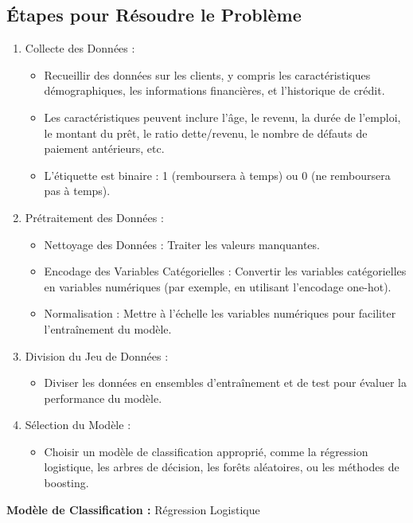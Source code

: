 \documentclass[12pt,a4paper,openay]{book}
\numberwithin{equation}{chapter}
\begin{document}
	\subsection*{Étapes pour R\'esoudre le Probl\`eme}
	
	\begin{enumerate}
		\item Collecte des Donn\'ees :
		\begin{itemize}
			\item  Recueillir des donn\'ees sur les clients, y compris les caract\'eristiques d\'emographiques, les informations financi\`eres, et l'historique de cr\'edit.
			\item  Les caract\'eristiques peuvent inclure l'âge, le revenu, la dur\'ee de l'emploi, le montant du pr\^et, le ratio dette/revenu, le nombre de d\'efauts de paiement ant\'erieurs, etc.
			\item  L'\'etiquette est binaire : 1 (remboursera \`a temps) ou 0 (ne remboursera pas \`a temps).
		\end{itemize}
		
		\item Pr\'etraitement des Donn\'ees :
		\begin{itemize}
			\item Nettoyage des Donn\'ees : Traiter les valeurs manquantes.
			\item Encodage des Variables Cat\'egorielles : Convertir les variables cat\'egorielles en variables num\'eriques (par exemple, en utilisant l'encodage one-hot).
			\item Normalisation : Mettre \`a l'\'echelle les variables num\'eriques pour faciliter l'entra\^inement du mod\`ele.
		\end{itemize}
		
		\item Division du Jeu de Donn\'ees :
		\begin{itemize}
			\item Diviser les donn\'ees en ensembles d'entra\^inement et de test pour \'evaluer la performance du mod\`ele.
		\end{itemize}
		
		\item S\'election du Mod\`ele :
		\begin{itemize}
		   \item  Choisir un mod\`ele de classification appropri\'e, comme la r\'egression logistique, les arbres de d\'ecision, les for\^ets al\'eatoires, ou les m\'ethodes de boosting.
		\end{itemize}
	\end{enumerate}
	\textbf{\large Mod\`ele de Classification :} R\'egression Logistique
		
\end{document}
